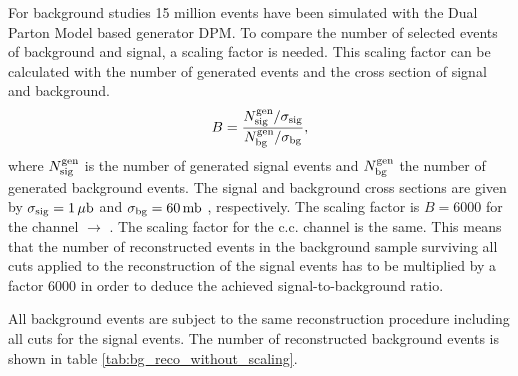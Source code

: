 For background studies 15 million events have been simulated with the Dual Parton Model based generator DPM.
To compare the number of selected events of background and signal, a scaling factor is needed.
This scaling factor can be calculated with the number of generated events and the cross section of signal and background.
\begin{equation}
		B = \frac{N^{\textnormal{gen}}_{\textnormal{sig}}/\sigma_{\textnormal{sig}}}{N^{\textnormal{gen}}_{\textnormal{bg}}/\sigma_{\textnormal{bg}}},
\label{eq:bg_scaling}
\end{equation}
where $N^{\textnormal{gen}}_{\textnormal{sig}}$ is the number of generated signal events and $N^{\textnormal{gen}}_{\textnormal{bg}}$ the number of generated background events.
The signal and background cross sections are given by $\sigma_{\textnormal{sig}} = 1\,\mu\textnormal{b}$ and $\sigma_{\textnormal{bg}} = 60\, \textnormal{mb}$ \cite{PANDAphysics2009}, respectively.
The scaling factor is $B=6000$ for the channel \pbarp $\rightarrow$ \excitedcascade \anticascade.
The scaling factor for the c.c. channel is the same. 
This means that the number of reconstructed events in the background sample surviving all cuts applied to the reconstruction of the signal events 
has to be multiplied by a factor 6000 in order to deduce the achieved signal-to-background ratio. 

%		 

All background events are subject to the same reconstruction procedure including all cuts for the signal events. 
The number of reconstructed background events is shown in table \ref{tab:bg_reco_without_scaling}.

